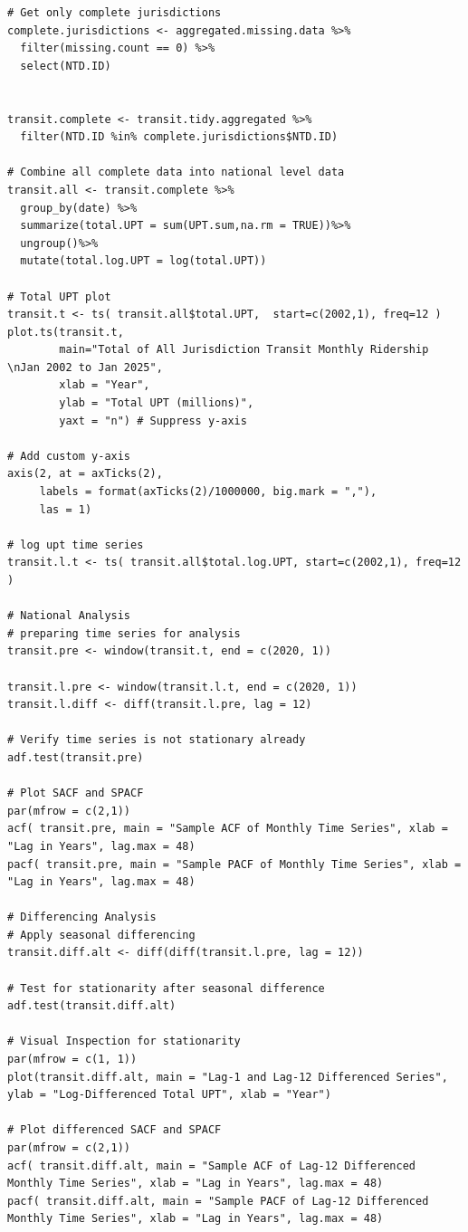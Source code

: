 \documentclass[11pt]{article}
\begin{document}
{\begin{verbatim}
# Get only complete jurisdictions
complete.jurisdictions <- aggregated.missing.data %>%
  filter(missing.count == 0) %>%
  select(NTD.ID)


transit.complete <- transit.tidy.aggregated %>%
  filter(NTD.ID %in% complete.jurisdictions$NTD.ID)

# Combine all complete data into national level data
transit.all <- transit.complete %>%
  group_by(date) %>%
  summarize(total.UPT = sum(UPT.sum,na.rm = TRUE))%>%
  ungroup()%>%
  mutate(total.log.UPT = log(total.UPT))

# Total UPT plot
transit.t <- ts( transit.all$total.UPT,  start=c(2002,1), freq=12 )
plot.ts(transit.t,
        main="Total of All Jurisdiction Transit Monthly Ridership \nJan 2002 to Jan 2025",
        xlab = "Year",
        ylab = "Total UPT (millions)",
        yaxt = "n") # Suppress y-axis

# Add custom y-axis
axis(2, at = axTicks(2),
     labels = format(axTicks(2)/1000000, big.mark = ","),
     las = 1)

# log upt time series
transit.l.t <- ts( transit.all$total.log.UPT, start=c(2002,1), freq=12 )

# National Analysis
# preparing time series for analysis
transit.pre <- window(transit.t, end = c(2020, 1))

transit.l.pre <- window(transit.l.t, end = c(2020, 1))
transit.l.diff <- diff(transit.l.pre, lag = 12)

# Verify time series is not stationary already
adf.test(transit.pre)

# Plot SACF and SPACF
par(mfrow = c(2,1))
acf( transit.pre, main = "Sample ACF of Monthly Time Series", xlab = "Lag in Years", lag.max = 48)
pacf( transit.pre, main = "Sample PACF of Monthly Time Series", xlab = "Lag in Years", lag.max = 48)

# Differencing Analysis
# Apply seasonal differencing
transit.diff.alt <- diff(diff(transit.l.pre, lag = 12))

# Test for stationarity after seasonal difference
adf.test(transit.diff.alt)

# Visual Inspection for stationarity
par(mfrow = c(1, 1))
plot(transit.diff.alt, main = "Lag-1 and Lag-12 Differenced Series", ylab = "Log-Differenced Total UPT", xlab = "Year")

# Plot differenced SACF and SPACF
par(mfrow = c(2,1))
acf( transit.diff.alt, main = "Sample ACF of Lag-12 Differenced Monthly Time Series", xlab = "Lag in Years", lag.max = 48)
pacf( transit.diff.alt, main = "Sample PACF of Lag-12 Differenced Monthly Time Series", xlab = "Lag in Years", lag.max = 48)


\end{verbatim}}
\end{document}
